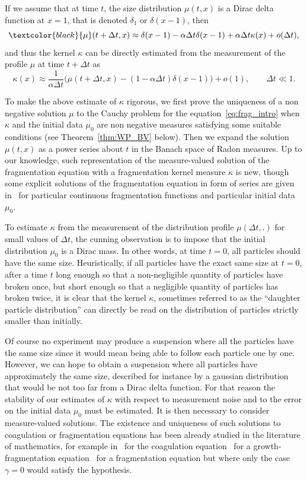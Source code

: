 \documentclass[10pt]{amsart}
\theoremstyle{definition}\newtheorem{defi}[theo]{Definition}\newtheorem{rema}[theo]{Remark}\newtheorem{exam}[theo]{Example}\newtheorem{exem}[theo]{Example}\newtheorem{nota}[theo]{Notation}
\renewcommand*\a{\alpha}
\begin{document}
If we assume that at time $t$, the size distribution $\mu (t,x)$ is a Dirac delta function at $x= 1$, that is denoted $\delta_1$ or $\delta(x-1)$, then
\begin{equation*}
\textcolor{black}{\mu }(t+\Delta t,x)\approx \delta(x-1) -\a \Delta t \delta(x-1) + \alpha \Delta t \kappa(x) +o(\Delta t),
\end{equation*}
and thus the kernel $\kappa$ can be directly estimated from the measurement of the profile $\mu $ at time $t+\Delta t$ as
\begin{equation*}
\kappa(x) \approx \dfrac{1}{\a \Delta t}\big(\mu (t+\Delta t,x) - (1-\a \Delta t) \delta(x-1)\big) +o(1), \qquad \Delta t \ll 1.
\end{equation*}

To make the above estimate of $\kappa$ rigorous, we first prove the uniqueness of a non negative solution $\mu $ to the Cauchy problem for the equation~\eqref{eq:frag_intro} when $\kappa$ and the initial data $\mu_0$ are non negative measures satisfying some suitable conditions (see Theorem~\ref{thm:WP_BV} below). Then we expand the solution $\mu(t,x)$ as a power series about $t$ in the Banach space of Radon measures. Up to our knowledge, such representation of the measure-valued solution of the fragmentation equation with a fragmentation kernel measure $\kappa$ is new, though some explicit solutions of the fragmentation equation in form of series are given in~\cite{ZiffMcGrady85, ZiffMcGrady86} for particular continuous fragmentation functions and particular initial data $\mu _0$.


To estimate $\kappa$ from the measurement of the distribution profile $\mu (\Delta t,.)$ for small values of $\Delta t$, the cunning observation is to impose that the initial distribution $\mu_0$ is a Dirac mass. In other words, at time $t=0$, all particles should have the same size. Heuristically, if all particles have the exact same size at $t=0$, after a time $t$ long enough so that a non-negligible quantity of particles have broken once, but short enough so that a negligible quantity of particles has broken twice, it is clear that the kernel $\kappa$, sometimes referred to as the ``daughter particle distribution'' can directly be read on the distribution of particles strictly smaller than initially.

Of course no experiment may produce a suspension where all the particles have the same size since it would mean being able to follow each particle one by one. However, we can hope to obtain a suspension where all particles have approximately the same size, described for instance by a gaussian distribution that would be not too far from a Dirac delta function. For that reason the stability of our estimates of $\kappa$ with respect to measurement noise and to the error on the initial data $\mu _0$ must be estimated. It is then necessary to consider measure-valued solutions. The existence and uniqueness of such solutions to coagulation or fragmentation equations has been already studied in the literature of mathematics, for example in~\cite{Bertoin1,Norris} for the coagulation equation~\cite{BCGM,BW} for a growth-fragmentation equation~\cite{CCGU} for a fragmentation equation but where only the case $\gamma =0$ would satisfy the hypothesis.
\end{document}
